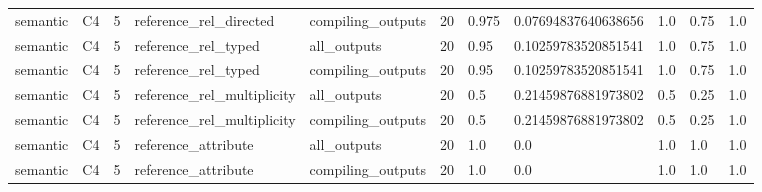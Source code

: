 \begin{tabular}{lllllllllll}
semantic & C4 & 5 & reference\_rel\_directed & compiling\_outputs & 20 & 0.975 & 0.07694837640638656 & 1.0 & 0.75 & 1.0 \\
semantic & C4 & 5 & reference\_rel\_typed & all\_outputs & 20 & 0.95 & 0.10259783520851541 & 1.0 & 0.75 & 1.0 \\
semantic & C4 & 5 & reference\_rel\_typed & compiling\_outputs & 20 & 0.95 & 0.10259783520851541 & 1.0 & 0.75 & 1.0 \\
semantic & C4 & 5 & reference\_rel\_multiplicity & all\_outputs & 20 & 0.5 & 0.21459876881973802 & 0.5 & 0.25 & 1.0 \\
semantic & C4 & 5 & reference\_rel\_multiplicity & compiling\_outputs & 20 & 0.5 & 0.21459876881973802 & 0.5 & 0.25 & 1.0 \\
semantic & C4 & 5 & reference\_attribute & all\_outputs & 20 & 1.0 & 0.0 & 1.0 & 1.0 & 1.0 \\
semantic & C4 & 5 & reference\_attribute & compiling\_outputs & 20 & 1.0 & 0.0 & 1.0 & 1.0 & 1.0 \\
\end{tabular}